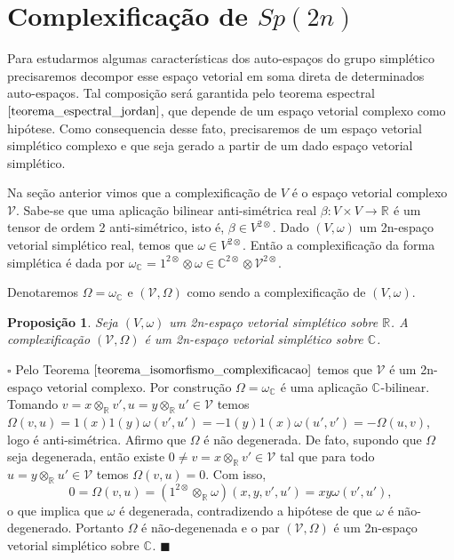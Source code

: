 \documentclass[12pt]{book}
\newtheorem{proposicao}[teorema]{Proposição}
\newenvironment{prova}[1]{$\square$ #1}{\hfill$\blacksquare$}
\newcommand{\complexificacao}[1]{#1_{\complexo{}}}
\newcommand{\complexificacaotensorialabrev}[1]{\mathcal{V}}
\newcommand{\complexificacaoelemento}[2]{#1\otimes_{\reta} #2}
\newcommand{\complexo}[1]{\mathbb{C}^{#1}}
\newcommand{\formaSimpletica}[2]{\omega(#1, #2)}
\newcommand{\formaSimpleticaExtendida}[2]{\Omega(#1, #2)}
\newcommand{\gruposimpletico}[1]{Sp(#1)}
\newcommand{\real}[1]{\mathbb{R}^{#1}}
\newcommand{\reta}{\real{}}
\begin{document}
	\section{Complexificação de $\gruposimpletico{2n}$}
	
	Para estudarmos algumas características dos auto-espaços do grupo simplético precisaremos decompor esse espaço vetorial em soma direta de determinados  auto-espaços. Tal composição será garantida pelo teorema espectral $\ref{teorema_espectral_jordan}$, que depende de um espaço vetorial complexo como hipótese. Como consequencia desse fato, precisaremos de um espaço vetorial simplético complexo e que seja gerado a partir de um dado espaço vetorial simplético.
	
	Na seção anterior vimos que a complexificação de $V$ é o espaço vetorial complexo $\complexificacaotensorialabrev{V}$. Sabe-se que uma aplicação bilinear anti-simétrica real $\beta: V\times V\to   \reta$ é um tensor de ordem 2 anti-simétrico, isto é, $\beta \in V^{2\otimes}$. Dado $(V, \omega)$ um 2n-espaço vetorial simplético real, temos que $\omega \in V^{2\otimes}$. Então a complexificação da forma simplética é dada por $\complexificacao{\omega} = 1^{2\otimes}\otimes \omega \in \complexo{2\otimes}\otimes \complexificacaotensorialabrev{V}^{2\otimes}$. 
	
	Denotaremos $\Omega = \complexificacao{\omega}$ e $(\complexificacaotensorialabrev{V}, \Omega)$ como sendo a complexificação de $(V, \omega)$.
	
	\begin{proposicao} Seja $(V, \omega)$ um 2n-espaço vetorial simplético sobre $\reta$. A complexificação $(\complexificacaotensorialabrev{V}, \Omega)$ é um 2n-espaço vetorial simplético sobre $\complexo{}$.
	\end{proposicao}
	\begin{prova}
		Pelo Teorema $\ref{teorema_isomorfismo_complexificacao}$ temos que $\complexificacaotensorialabrev{V}$ é um 2n-espaço vetorial complexo. Por construção $\Omega = \complexificacao{\omega}$ é uma aplicação $\complexo{}$-bilinear. Tomando $v = \complexificacaoelemento{x}{v'}, u=\complexificacaoelemento{y}{u'} \in \complexificacaotensorialabrev{V}$ temos $\Omega(v,u) = 1(x)1(y)\omega(v',u') = -1(y)1(x)\omega(u',v')  = -\Omega(u,v)$, logo é anti-simétrica. Afirmo que $\Omega$ é não degenerada. De fato, supondo que $\Omega$ seja degenerada, então existe $0\neq v = \complexificacaoelemento{x}{v'}\in \complexificacaotensorialabrev{V}$ tal que para todo $u=\complexificacaoelemento{y}{u'} \in \complexificacaotensorialabrev{V}$ temos $\formaSimpleticaExtendida{v}{u} = 0$. Com isso, 
		$$
		0=\Omega( v, u) = (\complexificacaoelemento{1^{2\otimes}}{\omega})(x,y ,v' ,u') = xy\formaSimpletica{v'}{u'},
		$$
		o que implica que $\omega$ é degenerada, contradizendo a hipótese de que $\omega$ é não-degenerado. Portanto $\Omega$ é não-degenenada e o par $(\complexificacaotensorialabrev{V}, \Omega)$ é um 2n-espaço vetorial simplético sobre $\complexo{}$.
	\end{prova}
	
\end{document}
